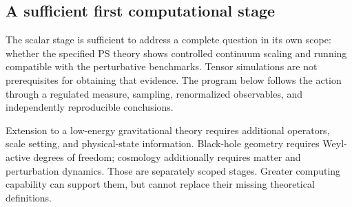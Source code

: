 \subsection{A sufficient first computational stage}
\label{sec:scalar-vertical-slice}

The scalar stage is sufficient to address a complete question in its own scope: whether the specified PS theory shows controlled continuum scaling and running compatible with the perturbative benchmarks.  Tensor simulations are not prerequisites for obtaining that evidence.  The program below follows the action through a regulated measure, sampling, renormalized observables, and independently reproducible conclusions.

Extension to a low-energy gravitational theory requires additional operators, scale setting, and physical-state information.  Black-hole geometry requires Weyl-active degrees of freedom; cosmology additionally requires matter and perturbation dynamics.  Those are separately scoped stages.  Greater computing capability can support them, but cannot replace their missing theoretical definitions.

